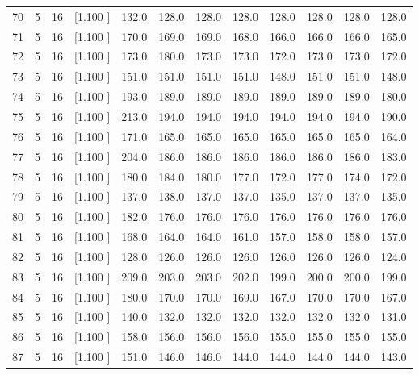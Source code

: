\documentclass[12pt,a4paper]{article}
\begin{document}
\begin{center}
{\begin{tabular}{r r r r r r r r r r r r}
  70&  5& 16&[1.100     ]&   132.0&   128.0&   128.0&   128.0&   128.0&   128.0&   128.0&   128.0\\[-0.02in]
  71&  5& 16&[1.100     ]&   170.0&   169.0&   169.0&   168.0&   166.0&   166.0&   166.0&   165.0\\[-0.02in]
  72&  5& 16&[1.100     ]&   173.0&   180.0&   173.0&   173.0&   172.0&   173.0&   173.0&   172.0\\[-0.02in]
  73&  5& 16&[1.100     ]&   151.0&   151.0&   151.0&   151.0&   148.0&   151.0&   151.0&   148.0\\[-0.02in]
  74&  5& 16&[1.100     ]&   193.0&   189.0&   189.0&   189.0&   189.0&   189.0&   189.0&   180.0\\[-0.02in]
  75&  5& 16&[1.100     ]&   213.0&   194.0&   194.0&   194.0&   194.0&   194.0&   194.0&   190.0\\[-0.02in]
  76&  5& 16&[1.100     ]&   171.0&   165.0&   165.0&   165.0&   165.0&   165.0&   165.0&   164.0\\[-0.02in]
  77&  5& 16&[1.100     ]&   204.0&   186.0&   186.0&   186.0&   186.0&   186.0&   186.0&   183.0\\[-0.02in]
  78&  5& 16&[1.100     ]&   180.0&   184.0&   180.0&   177.0&   172.0&   177.0&   174.0&   172.0\\[-0.02in]
  79&  5& 16&[1.100     ]&   137.0&   138.0&   137.0&   137.0&   135.0&   137.0&   137.0&   135.0\\[-0.02in]
  80&  5& 16&[1.100     ]&   182.0&   176.0&   176.0&   176.0&   176.0&   176.0&   176.0&   176.0\\[-0.02in]
  81&  5& 16&[1.100     ]&   168.0&   164.0&   164.0&   161.0&   157.0&   158.0&   158.0&   157.0\\[-0.02in]
  82&  5& 16&[1.100     ]&   128.0&   126.0&   126.0&   126.0&   126.0&   126.0&   126.0&   124.0\\[-0.02in]
  83&  5& 16&[1.100     ]&   209.0&   203.0&   203.0&   202.0&   199.0&   200.0&   200.0&   199.0\\[-0.02in]
  84&  5& 16&[1.100     ]&   180.0&   170.0&   170.0&   169.0&   167.0&   170.0&   170.0&   167.0\\[-0.02in]
  85&  5& 16&[1.100     ]&   140.0&   132.0&   132.0&   132.0&   132.0&   132.0&   132.0&   131.0\\[-0.02in]
  86&  5& 16&[1.100     ]&   158.0&   156.0&   156.0&   156.0&   155.0&   155.0&   155.0&   155.0\\[-0.02in]
  87&  5& 16&[1.100     ]&   151.0&   146.0&   146.0&   144.0&   144.0&   144.0&   144.0&   143.0\\[-0.02in]

\end{tabular}}
\end{center}
\end{document}
